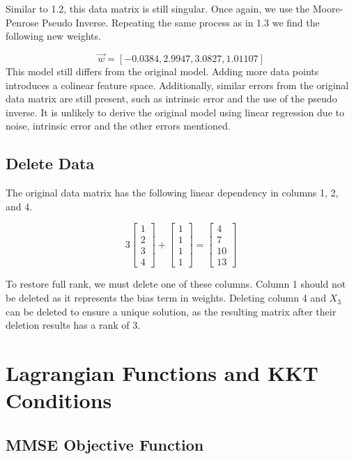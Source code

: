 \documentclass{article}
\begin{document}
\noindent
Similar to 1.2, this data matrix is still singular. Once again, we use the Moore-Penrose Pseudo Inverse. Repeating the same process as in 1.3 we find the following new weights. 

\[
\Vec{w} = [-0.0384, 2.9947, 3.0827, 1.01107]
\]
\noindent
This model still differs from the original model. Adding more data points introduces a colinear feature space. Additionally, similar errors from the original data matrix are still present, such as intrinsic error and the use of the pseudo inverse. It is unlikely to derive the original model using linear regression due to noise, intrinsic error and the other errors mentioned.

\subsection{Delete Data}
The original data matrix has the following linear dependency in columns 1, 2, and 4.

\[3 \begin{bmatrix}
    1 \\
    2 \\
    3 \\
    4 
\end{bmatrix} + \begin{bmatrix}
    1 \\
    1 \\
    1 \\
    1 
\end{bmatrix} = 
\begin{bmatrix}
    4 \\
    7 \\
    10 \\
    13
\end{bmatrix}
\]

\noindent
To restore full rank, we must delete one of these columns. Column 1 should not be deleted as it represents the bias term in weights. Deleting column 4 and $X_3$ can be deleted to ensure a unique solution, as the resulting matrix after their deletion results has a rank of 3.

\section{Lagrangian Functions and KKT Conditions}
\subsection{MMSE Objective Function}
\end{document}
